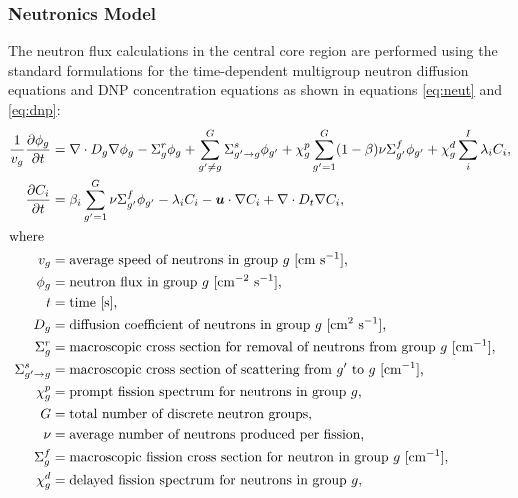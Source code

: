 \subsubsection{Neutronics Model}

The neutron flux calculations in the central core region are
performed using the standard formulations for the time-dependent multigroup
neutron diffusion equations and \gls{DNP} concentration equations as shown in
equations \ref{eq:neut} and \ref{eq:dnp}:
%
\begin{align}
    \frac{1}{v_g} \frac{\partial \phi_g}{\partial t} &= \nabla \cdot D_g
    \nabla \phi_g - \Sigma^r_g \phi_g +
    \sum^G_{g' \neq g} \Sigma^s_{g' \rightarrow g} \phi_{g'} + \chi^p_g
    \sum^G_{g'=1} (1-\beta) \nu \Sigma^f_{g'} \phi_{g'} + \chi^d_g \sum^I_i
    \lambda_i C_i, \label{eq:neut} \\
    \frac{\partial C_i}{\partial t} &= \beta_i \sum^G_{g'=1} \nu \Sigma^f_{g'}
    \phi_{g'} - \lambda_i C_i - \boldsymbol{u} \cdot \nabla C_i + \nabla \cdot
    D_t \nabla C_i, \label{eq:dnp} \\
    \intertext{where}
    v_g &= \text{average speed of neutrons in group $g$ [cm s$^{-1}$],} 
    \nonumber \\
    \phi_g &= \text{neutron flux in group $g$ [cm$^{-2}$ s$^{-1}$],} \nonumber
    \\
    t &= \text{time [s],} \nonumber \\
    D_g &= \text{diffusion coefficient of neutrons in group $g$ [cm$^2$
    s$^{-1}$],} \nonumber \\
    \Sigma^r_g &= \text{macroscopic cross section for removal of neutrons from
    group $g$ [cm$^{-1}$],} \nonumber \\
    \Sigma^s_{g' \rightarrow g} &= \text{macroscopic cross section of
    scattering from $g'$ to $g$ [cm$^{-1}$],} \nonumber \\
    \chi^p_g &= \text{prompt fission spectrum for neutrons in group $g$,}
    \nonumber \\
    G &= \text{total number of discrete neutron groups,} \nonumber \\
    \nu &= \text{average number of neutrons produced per fission,} \nonumber
    \\
    \Sigma^f_{g} &= \text{macroscopic fission cross section for neutron in
    group $g$ [cm$^{-1}$],} \nonumber \\
    \chi^d_g &= \text{delayed fission spectrum for neutrons in group $g$,}
    \nonumber \\

\end{align}
